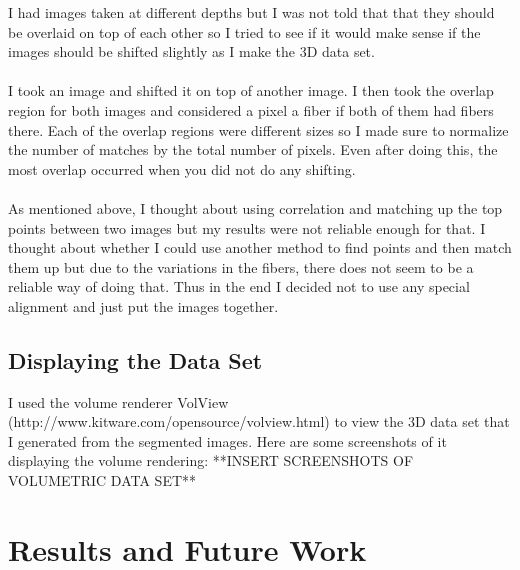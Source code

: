 \documentclass[11pt,psfig]{article}
\begin{document}
I had images taken at different depths but I was not told that that they should be overlaid on top of each other so I tried to see if it would make sense if the images should be shifted slightly as I make the 3D data set. \\
\\
I took an image and shifted it on top of another image. I then took the overlap region for both images and considered a pixel a fiber if both of them had fibers there. Each of the overlap regions were different sizes so I made sure to normalize the number of matches by the total number of pixels. Even after doing this, the most overlap occurred when you did not do any shifting. \\
\\
As mentioned above, I thought about using correlation and matching up the top points between two images but my results were not reliable enough for that. I thought about whether I could use another method to find points and then match them up but due to the variations in the fibers, there does not seem to be a reliable way of doing that. Thus in the end I decided not to use any special alignment and just put the images together. 

\subsection{Displaying the Data Set}

I used the volume renderer VolView (http://www.kitware.com/opensource/volview.html) to view the 3D data set that I generated from the segmented images. Here are some screenshots of it displaying the volume rendering:
**INSERT SCREENSHOTS OF VOLUMETRIC DATA SET**

\section{Results and Future Work}
\end{document}
